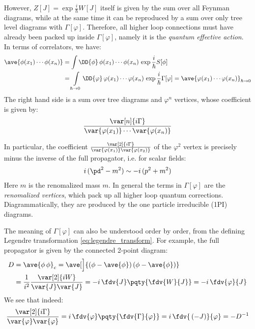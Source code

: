 \documentclass[a4paper
	,10pt
]{article}
\begin{document}
	However, $Z[J] = \exp \frac{i}{\hbar} W[J]$ itself is given by the sum over all Feynman diagrams, while at the same time it can be reproduced by a sum over only tree level diagrams with $\Gamma[\varphi]$. Therefore, all higher loop connections must have already been packed up inside $\Gamma[\varphi]$, namely it is the \textit{quantum effective action}. In terms of correlators, we have:
	\begin{equation}
	\begin{aligned}
		\ave{\phi(x_1)\cdots\phi(x_n)}
		&= \int
			\DD{\phi}
			\,\phi(x_1)\cdots\phi(x_n)\,
			\exp \frac{i}{\hbar}
				S[\phi]
	\\
		&= \int\limits_{\hbar\to 0}
			\DD{\varphi}
			\,\varphi(x_1)\cdots\varphi(x_n)\,
			\exp \frac{i}{\hbar}
				\Gamma[\varphi]
		= \ave{\varphi(x_1)\cdots\varphi(x_n)}_{\hbar\to 0}
	\end{aligned}
	\end{equation}
	The right hand side is a sum over tree diagrams and $\varphi^n$ vertices, whose coefficient is given by:
	\begin{equation}
		\frac{\var[n]{i\Gamma}}{
			\var{\varphi(x_1)}\cdots\var{\varphi(x_n)}
		}
	\end{equation}
	
	In particular, the coefficient $
		\frac{\var[2]{i\Gamma}}{
			\var{\varphi(x_1)} \var{\varphi(x_2)}
		}
	$ of the $\varphi^2$ vertex is precisely minus the inverse of the full propagator, i.e. for scalar fields:
	\begin{equation}
		i\,(\pd^2-m^2) \sim -i\,(p^2 + m^2)
	\end{equation}
	Here $m$ is the renomalized mass $m$. In general the terms in $\Gamma[\varphi]$ are the \textit{renomalized vertices}, which pack up all higher loop quantum corrections. Diagrammatically, they are produced by the one particle irreducible (1PI) diagrams. 
	
	The meaning of $\Gamma[\varphi]$ can also be understood order by order, from the defining Legendre transformation \eqref{eq:legendre_transform}. For example, the full propagator is given by the connected 2-point diagram:
	\begin{equation}
	\begin{aligned}
		D
		&= \ave{\phi\,\phi}_c
		= \ave[\Big]{
			(\phi - \ave{\phi})\,(\phi - \ave{\phi})
		} \\
		&= \frac{1}{i^2}
		\frac{\var[2]{iW}}{
			\var{J} \var{J}
		}
		= -i\,\fdv{J} \pqty{\fdv{W}{J}}
		= -i\,\fdv{\varphi}{J}
	\end{aligned}
	\end{equation}
	We see that indeed:
	\begin{equation}
		\frac{\var[2]{i\Gamma}}{
			\var{\varphi} \var{\varphi}
		}
		= i\,\fdv{\varphi} \pqty{\fdv{\Gamma}{\varphi}}
		= i\,\fdv{\,(-J)}{\varphi}
		= - D^{-1}
	\end{equation}
	
\end{document}
